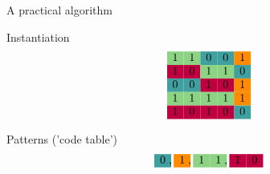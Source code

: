 \documentclass[11pt]{beamer}
\begin{document}
\begin{frame}{A practical algorithm}

\newcommand{\ca}{\cellcolor{cyan!45!yellow}}
\newcommand{\cb}{\cellcolor{red!75!blue}}
\newcommand{\cc}{\cellcolor{violet}}
\newcommand{\cd}{\cellcolor{teal!75}}
\newcommand{\ce}{\cellcolor{red!45!yellow}}

Instantiation
$$
\begin{matrix}
\ca 1 & \ca 1 & \cd 0 & \cd 0 & \ce 1  \\
\cb 1 & \cb 0 & \ca 1 & \ca 1 & \cd 0  \\
\cd 0 & \cd 0 & \cb 1 & \cb 0 & \ce 1  \\
\ca 1 & \ca 1 & \ca 1 & \ca 1 & \ce 1  \\
\cb 1 & \cb 0 & \cb 1 & \cb 0 & \cd 0  \\
\end{matrix}
$$

\small
Patterns ('code table')
$$
\begin{matrix}
\cd 0  \\
\end{matrix} \;,\enspace
\begin{matrix}
\ce 1 \\
\end{matrix} \;,\enspace
\begin{matrix}
\ca 1 & \ca 1 \\
\end{matrix} \;,\enspace
\begin{matrix}
\cb 1 & \cb 0 \\
\end{matrix}
$$ 

\end{frame}

\end{document}
